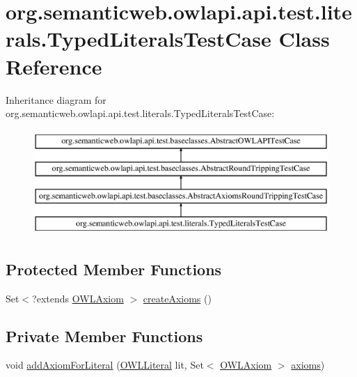 \hypertarget{classorg_1_1semanticweb_1_1owlapi_1_1api_1_1test_1_1literals_1_1_typed_literals_test_case}{\section{org.\-semanticweb.\-owlapi.\-api.\-test.\-literals.\-Typed\-Literals\-Test\-Case Class Reference}
\label{classorg_1_1semanticweb_1_1owlapi_1_1api_1_1test_1_1literals_1_1_typed_literals_test_case}
}
Inheritance diagram for org.\-semanticweb.\-owlapi.\-api.\-test.\-literals.\-Typed\-Literals\-Test\-Case\-:\begin{figure}[H]
\begin{center}
\leavevmode
\includegraphics[height=4.000000cm]{classorg_1_1semanticweb_1_1owlapi_1_1api_1_1test_1_1literals_1_1_typed_literals_test_case}
\end{center}
\end{figure}
\subsection*{Protected Member Functions}
\begin{DoxyCompactItemize}
\item 
Set$<$?extends \hyperlink{interfaceorg_1_1semanticweb_1_1owlapi_1_1model_1_1_o_w_l_axiom}{O\-W\-L\-Axiom} $>$ \hyperlink{classorg_1_1semanticweb_1_1owlapi_1_1api_1_1test_1_1literals_1_1_typed_literals_test_case_a90c51d75274cdc11dd807d01c0971284}{create\-Axioms} ()
\end{DoxyCompactItemize}
\subsection*{Private Member Functions}
\begin{DoxyCompactItemize}
\item 
void \hyperlink{classorg_1_1semanticweb_1_1owlapi_1_1api_1_1test_1_1literals_1_1_typed_literals_test_case_af38c4be16548a6acec2d60e772210a8d}{add\-Axiom\-For\-Literal} (\hyperlink{interfaceorg_1_1semanticweb_1_1owlapi_1_1model_1_1_o_w_l_literal}{O\-W\-L\-Literal} lit, Set$<$ \hyperlink{interfaceorg_1_1semanticweb_1_1owlapi_1_1model_1_1_o_w_l_axiom}{O\-W\-L\-Axiom} $>$ \hyperlink{classorg_1_1semanticweb_1_1owlapi_1_1api_1_1test_1_1baseclasses_1_1_abstract_axioms_round_tripping_test_case_add68142ec0b0cf9d63a6c12280b7275b}{axioms})
\end{DoxyCompactItemize}
